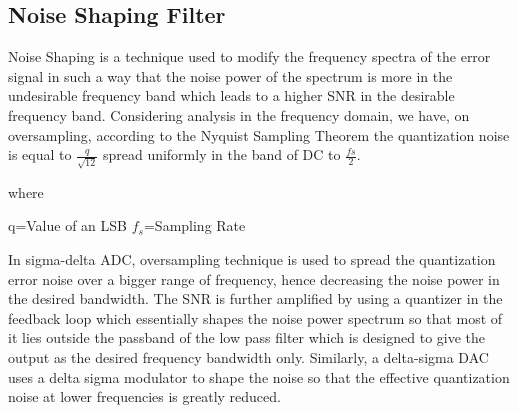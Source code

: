 \documentclass[colorlinks=true,pdfstartview=FitV,linkcolor=blue,
            citecolor=red,urlcolor=magenta]{ligodoc}
\begin{document}
\subsection{Noise Shaping Filter}
Noise Shaping is a technique used to modify the frequency spectra of the error signal in such a way that the noise power of the spectrum is more in the undesirable frequency band which leads to a higher SNR in the desirable frequency band. 
Considering analysis in the frequency domain, we have, on oversampling, according to the Nyquist Sampling Theorem the quantization noise is equal to $\frac{q}{\sqrt{12}}$ spread uniformly in the band of DC to $\frac{fs}{2}$.\cite{Interpolation}

where 

q=Value of an LSB
$f_{s}$=Sampling Rate

In sigma-delta ADC, oversampling technique is used to spread the quantization error noise over a bigger range of frequency, hence decreasing the noise power in the desired bandwidth. The SNR is further amplified by using a quantizer in the feedback loop which essentially shapes the noise power spectrum so that most of it lies outside the passband of the low pass filter which is designed to give the output as the desired frequency bandwidth only. \cite{SNR}
Similarly, a delta-sigma DAC \cite{Interpolation} uses a delta sigma modulator to shape the noise so that the effective quantization noise at lower frequencies is greatly reduced.
\end{document}
